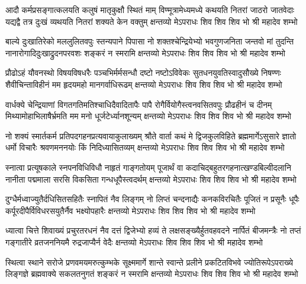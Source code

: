 
\fourlineindentedshloka
{आदौ कर्मप्रसङ्गात्कलयति कलुषं मातृकुक्षौ स्थितं माम्}
{विण्मूत्रामेध्यमध्ये कथयति नितरां जाठरो जातवेदाः}
{यद्यद्वै तत्र दुःखं व्यथयति नितरां शक्यते केन वक्तुम्}
{क्षन्तव्यो मेऽपराधः शिव शिव शिव भो श्री महादेव शम्भो} %

\fourlineindentedshloka
{बाल्ये दुःखातिरेको मललुलितवपुः स्तन्यपाने पिपासा}
{नो शक्तश्चेन्द्रियेभ्यो भवगुणजनिता जन्तवो मां तुदन्ति}
{नानारोगादिदुःखाद्रुदनपरवशः शङ्करं न स्मरामि}
{क्षन्तव्यो मेऽपराधः शिव शिव शिव भो श्री महादेव शम्भो} %

\fourlineindentedshloka
{प्रौढोऽहं यौवनस्थो विषयविषधरैः पञ्चभिर्मर्मसन्धौ}
{दष्टो नष्टोऽविवेकः सुतधनयुवतिस्वादुसौख्ये निषण्णः}
{शैवीचिन्ताविहीनं मम हृदयमहो मानगर्वाधिरूढम्}
{क्षन्तव्यो मेऽपराधः शिव शिव शिव भो श्री महादेव शम्भो} %

\fourlineindentedshloka
{वार्धक्ये चेन्द्रियाणां विगतगतिमतिश्चाधिदैवादितापैः}
{पापै रोगैर्वियोगैस्त्वनवसितवपुः प्रौढहीनं च दीनम्}
{मिथ्यामोहाभिलाषैर्भ्रमति मम मनो धूर्जटेर्ध्यानशून्यम्}
{क्षन्तव्यो मेऽपराधः शिव शिव शिव भो श्री महादेव शम्भो} %

\fourlineindentedshloka
{नो शक्यं स्मार्तकर्म प्रतिपदगहनप्रत्यवायाकुलाख्यम्}
{श्रौते वार्ता कथं मे द्विजकुलविहिते ब्रह्ममार्गेऽसुसारे}
{ज्ञातो धर्मो विचारैः श्रवणमननयोः किं निदिध्यासितव्यम्}
{क्षन्तव्यो मेऽपराधः शिव शिव शिव भो श्री महादेव शम्भो} %

\fourlineindentedshloka
{स्नात्वा प्रत्यूषकाले स्नपनविधिविधौ नाहृतं गाङ्गतोयम्}
{पूजार्थं वा कदाचिद्बहुतरगहनात्खण्डबिल्वीदलानि}
{नानीता पद्ममाला सरसि विकसिता गन्धधूपैस्त्वदर्थम्}
{क्षन्तव्यो मेऽपराधः शिव शिव शिव भो श्री महादेव शम्भो} %

\fourlineindentedshloka
{दुग्धैर्मध्वाज्युतैर्दधिसितसहितैः स्नापितं नैव लिङ्गम्}
{नो लिप्तं चन्दनाद्यैः कनकविरचितैः पूजितं न प्रसूनैः}
{धूपैः कर्पूरदीपैर्विविधरसयुतैर्नैव भक्ष्योपहारैः}
{क्षन्तव्यो मेऽपराधः शिव शिव शिव भो श्री महादेव शम्भो} %

\fourlineindentedshloka
{ध्यात्वा चित्ते शिवाख्यं प्रचुरतरधनं नैव दत्तं द्विजेभ्यो}
{हव्यं ते लक्षसङ्ख्यैर्हुतवहवदने नार्पितं बीजमन्त्रैः}
{नो तप्तं गङ्गातीरे व्रतजननियमै रुद्रजाप्यैर्न वेदैः}
{क्षन्तव्यो मेऽपराधः शिव शिव शिव भो श्री महादेव शम्भो} %

\fourlineindentedshloka
{स्थित्वा स्थाने सरोजे प्रणवमयमरुत्कुम्भके सूक्ष्ममार्गे}
{शान्ते स्वान्ते प्रलीने प्रकटितविभवे ज्योतिरूपेऽपराख्ये}
{लिङ्गज्ञे ब्रह्मवाक्ये सकलतनुगतं शङ्करं न स्मरामि}
{क्षन्तव्यो मेऽपराधः शिव शिव शिव भो श्री महादेव शम्भो} %


